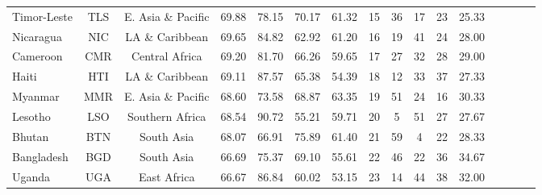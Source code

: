 \begin{singlespace}
{\begin{longtable}[H]{lccccccccccccccc}
Timor-Leste                       & TLS           & E. Asia \& Pacific & 69.88       & 78.15            & 70.17                     & 61.32           & 15             & 36                  & 17                           & 23                 & 25.33                  \\
Nicaragua                         & NIC           & LA \& Caribbean    & 69.65       & 84.82            & 62.92                     & 61.20           & 16             & 19                  & 41                           & 24                 & 28.00                  \\
Cameroon                          & CMR           & Central Africa     & 69.20       & 81.70            & 66.26                     & 59.65           & 17             & 27                  & 32                           & 28                 & 29.00                  \\
Haiti                             & HTI           & LA \& Caribbean    & 69.11       & 87.57            & 65.38                     & 54.39           & 18             & 12                  & 33                           & 37                 & 27.33                  \\
Myanmar                           & MMR           & E. Asia \& Pacific & 68.60       & 73.58            & 68.87                     & 63.35           & 19             & 51                  & 24                           & 16                 & 30.33                  \\
Lesotho                           & LSO           & Southern Africa    & 68.54       & 90.72            & 55.21                     & 59.71           & 20             & 5                   & 51                           & 27                 & 27.67                  \\
Bhutan                            & BTN           & South Asia         & 68.07       & 66.91            & 75.89                     & 61.40           & 21             & 59                  & 4                            & 22                 & 28.33                  \\
Bangladesh                        & BGD           & South Asia         & 66.69       & 75.37            & 69.10                     & 55.61           & 22             & 46                  & 22                           & 36                 & 34.67                  \\
Uganda                            & UGA           & East Africa        & 66.67       & 86.84            & 60.02                     & 53.15           & 23             & 14                  & 44                           & 38                 & 32.00                  \\

\end{longtable}}
\end{singlespace}
